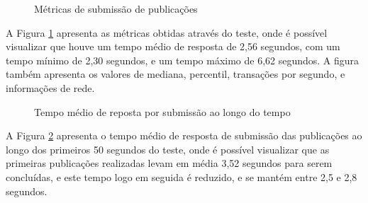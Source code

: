 \begin{figure}[H]
    \caption{Métricas de submissão de publicações}
    \label{fig:matrics-create-research}
\end{figure}

A Figura \ref{fig:matrics-create-research} apresenta as métricas obtidas através do
teste, onde é possível visualizar que houve um tempo médio de resposta de 2,56 segundos,
com um tempo mínimo de 2,30 segundos, e um tempo máximo de 6,62 segundos. A figura também
apresenta os valores de mediana, percentil, transações por segundo, e informações de rede.

\begin{figure}[H]
    \caption{Tempo médio de reposta por submissão ao longo do tempo}
    \centering
    \label{fig:create-response-over-time}
\end{figure}

A Figura \ref{fig:create-response-over-time} apresenta o tempo médio de resposta
de submissão das publicações ao longo dos primeiros 50 segundos do teste, onde é
possível visualizar que as primeiras publicações realizadas levam em média
3,52 segundos para serem concluídas, e este tempo logo em seguida é reduzido, e se
mantém entre 2,5 e 2,8 segundos.

